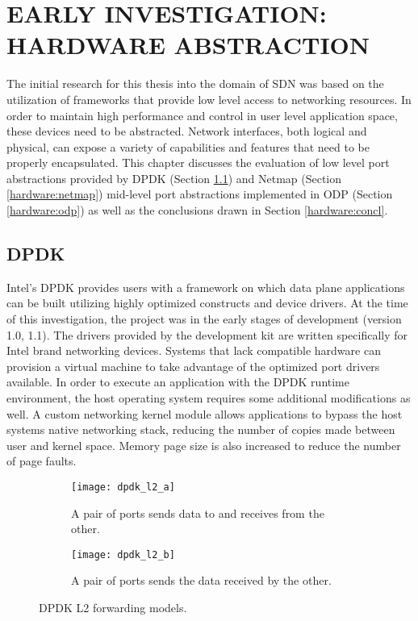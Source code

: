 \chapter{EARLY INVESTIGATION: HARDWARE ABSTRACTION}
\label{hardware}
The initial research for this thesis into the domain of SDN was based on
the utilization of frameworks that provide low level access to networking
resources. In order to maintain high performance and control in user level
application space, these devices need to be abstracted. Network interfaces,
both logical and physical, can expose a variety of capabilities and features
that need to be properly encapsulated. This chapter discusses the evaluation of
low level port abstractions provided by DPDK (Section \ref{hardware:dpdk}) and
Netmap (Section \ref{hardware:netmap}) mid-level port abstractions implemented
in ODP (Section \ref{hardware:odp}) as well as the conclusions drawn in Section
\ref{hardware:concl}.

\section{DPDK}
\label{hardware:dpdk}
Intel's DPDK provides users with a framework on which data plane applications
can be built utilizing highly optimized constructs and device drivers. At the
time of this investigation, the project was in the early stages of development
(version 1.0, 1.1). The drivers provided by the development kit are written
specifically for Intel brand networking devices. Systems that lack compatible
hardware can provision a virtual machine to take advantage of the optimized
port drivers available. In order to execute an application with the DPDK runtime
environment, the host operating system requires some additional modifications
as well. A custom networking kernel module allows applications to bypass the
host systems native networking stack, reducing the number of copies made
between user and kernel space. Memory page size is also increased to reduce
the number of page faults.

\begin{figure}[h!]
  \centering
  \begin{subfigure}[b]{0.48\textwidth}
    \centering
    \texttt{[image: dpdk\_l2\_a]}
    \caption{A pair of ports sends data to and receives from the other.}
  \end{subfigure}
  \hfill
  \begin{subfigure}[b]{0.48\textwidth}
    \centering
    \texttt{[image: dpdk\_l2\_b]}
    \caption{A pair of ports sends the data received by the other.}
  \end{subfigure}
  \caption{DPDK L2 forwarding models.}
  \label{dpdk_l2}
\end{figure}

